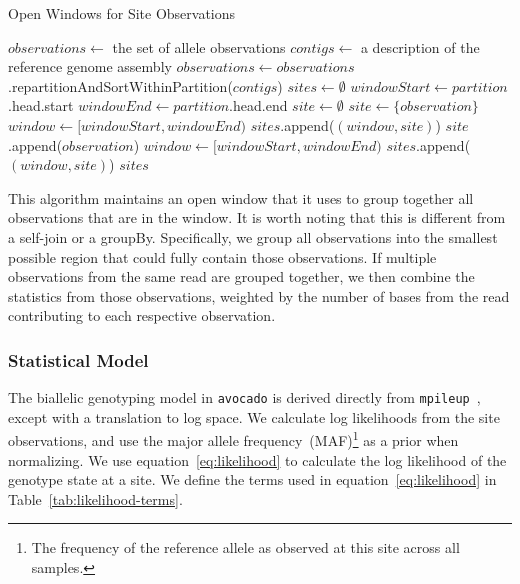\documentclass[masters]{ucbthesis}
\begin{document}
\begin{algorithm}
\caption{Open Windows for Site Observations}
\label{alg:window-observations}
\begin{algorithmic}
\STATE $observations \leftarrow$ the set of allele observations
\STATE $contigs \leftarrow$ a description of the reference genome assembly
\STATE $observations \leftarrow observations$.repartitionAndSortWithinPartition($contigs$)
\STATE $sites \leftarrow \emptyset$
\STATE $windowStart \leftarrow partition$.head.start
\STATE $windowEnd \leftarrow partition$.head.end
\STATE $site \leftarrow \emptyset$
\STATE $site \leftarrow \{observation\}$
\ELSE
\STATE $window \leftarrow [windowStart, windowEnd)$
\STATE $sites$.append($(window, site)$)
\STATE $site$.append($observation$)
\ENDIF
\ENDFOR
{}
\STATE $window \leftarrow [windowStart, windowEnd)$
\STATE $sites$.append($(window, site)$)
\ENDIF
\ENDFOR
\RETURN $sites$
\end{algorithmic}
\end{algorithm}

This algorithm maintains an open window that it uses to group together all observations that are in the window. It is
worth noting that this is different from a self-join or a groupBy. Specifically, we group all observations into the smallest
possible region that could fully contain those observations. If multiple observations from the same read are grouped
together, we then combine the statistics from those observations, weighted by the number of bases from the read
contributing to each respective observation.

\subsubsection{Statistical Model}
\label{sec:genotyping-model}

The biallelic genotyping model in \texttt{avocado} is derived directly from \texttt{mpileup}~\cite{li11snp}, except with a
translation to log space. We calculate log likelihoods from the site observations, and use the major allele
frequency~(MAF)\footnote{The frequency of the reference allele as observed at this site across all samples.} as a prior
when normalizing. We use equation~\eqref{eq:likelihood} to calculate the log likelihood of the genotype state at a site.
We define the terms used in equation~\eqref{eq:likelihood} in Table~\ref{tab:likelihood-terms}.
\end{document}
